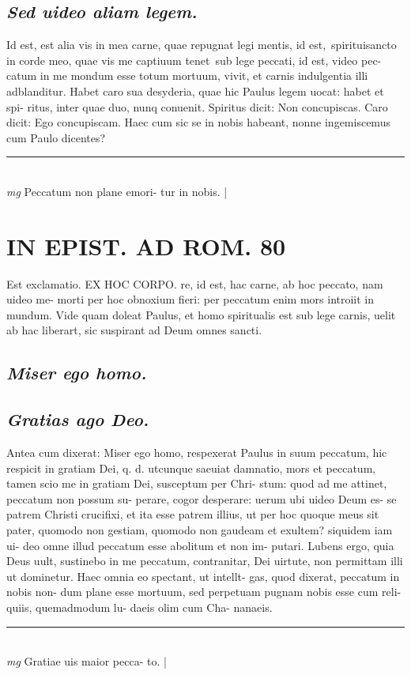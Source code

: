 \documentclass{article}
\begin{document}
\begin{pages}
\subsection*{\textit{Sed uideo aliam legem. }}\pstart Id est, est alia vis in mea carne, quae repugnat legi mentis, id est, spirituisancto in corde meo, quae vis me captiuum tenet sub lege peccati, id est, video pec- catum in me mondum esse totum mortuum, vivit, et carnis indulgentia illi adblanditur. Habet caro sua desyderia, quae hic Paulus legem uocat: habet et spi- ritus, inter quae duo, nunq conuenit. Spiritus dicit: Non concupiscas. Caro dicit: Ego concupiscam. Haec cum sic se in nobis habeant, nonne ingemiscemus cum Paulo dicentes?  \pend
\vspace{0.5cm}\noindent
\vspace{0.2cm}\rule{1cm}{0.2pt}\\ 
\hspace{0.2cm}\textit{mg}
\footnotesize Peccatum non plane emori- tur in nobis.  
\normalsize| 
\section*{IN EPIST. AD ROM.  80 }
\marginpar{[ p.]}
\marginpar{[ p.]}\pstart Est exclamatio. EX HOC CORPO.  re, id est, hac carne, ab hoc peccato, nam uideo me- morti per hoc obnoxium fieri: per peccatum enim mors introiit in mundum. Vide quam doleat Paulus, et homo spiritualis est sub lege carnis, uelit ab hac liberart, sic suspirant ad Deum omnes sancti.   \pend
{}
{}
\subsection*{\textit{Miser ego homo. }}
{}
\subsection*{\textit{Gratias ago Deo. }}\pstart Antea cum dixerat: Miser ego homo, respexerat Paulus in suum peccatum, hic respicit in gratiam Dei, q. d. utcunque saeuiat damnatio, mors et peccatum, tamen scio me in gratiam Dei, susceptum per Chri- stum: quod ad me attinet, peccatum non possum su- perare, cogor desperare: uerum ubi uideo Deum es- se patrem Christi crucifixi, et ita esse patrem illius, ut per hoc quoque meus sit pater, quomodo non gestiam, quomodo non gaudeam et exultem? siquidem iam ui- deo omne illud peccatum esse abolitum et non im- putari. Lubens ergo, quia Deus uult, sustinebo in me peccatum, contranitar, Dei uirtute, non permittam illi ut dominetur. Haec omnia eo spectant, ut intellt- gas, quod dixerat, peccatum in nobis non- dum plane esse mortuum, sed perpetuam pugnam nobis esse cum reli- quiis, quemadmodum lu- daeis olim cum Cha- nanaeis.   \pend
\vspace{0.5cm}\noindent
\vspace{0.2cm}\rule{1cm}{0.2pt}\\ 
\hspace{0.2cm}\textit{mg}
\footnotesize Gratiae uis maior pecca- to.  
\normalsize| 

\end{pages}
\end{document}
